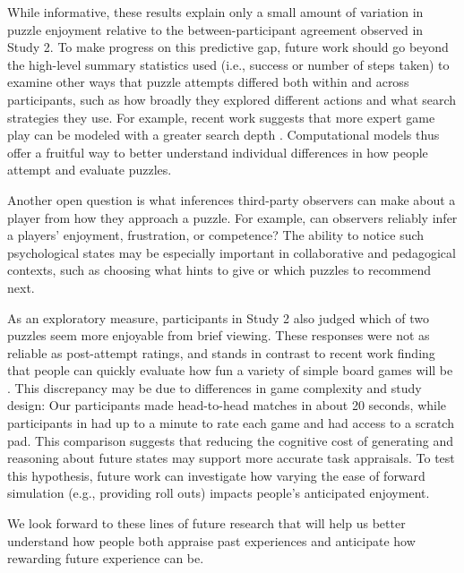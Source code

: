 \documentclass[10pt,letterpaper]{article}
\begin{document}
While informative, these results explain only a small amount of variation in puzzle enjoyment relative to the between-participant agreement observed in Study 2. %
To make progress on this predictive gap, future work should go beyond the high-level summary statistics used (i.e., success or number of steps taken) to examine other ways that puzzle attempts differed both within and across participants, such as how broadly they explored different actions and what search strategies they use. For example, recent work suggests that more expert game play can be modeled with a greater search depth \cite{vanOpheusden2023}. Computational models thus offer a fruitful way to better understand individual differences in how people attempt and evaluate puzzles. 

Another open question is what inferences third-party observers can make about a player from how they approach a puzzle. For example, can observers reliably infer a players' enjoyment, frustration, or competence? The ability to notice such psychological states may be especially important in collaborative and pedagogical contexts, such as choosing what hints to give or which puzzles to recommend next.

As an exploratory measure, participants in Study 2 also judged which of two puzzles seem more enjoyable from brief viewing. These responses were not as reliable as post-attempt ratings, and stands in contrast to recent work finding that people can quickly evaluate how fun a variety of simple board games will be \cite{zhang2024people}. 
This discrepancy may be due to differences in game complexity and study design: Our participants made head-to-head matches in about 20 seconds, while participants in \cite{zhang2024people} had up to a minute to rate each game and had access to a scratch pad. This comparison suggests that reducing the cognitive cost of generating and reasoning about future states may support more accurate task appraisals. To test this hypothesis, future work can investigate how varying the ease of forward simulation (e.g., providing roll outs) impacts people's anticipated enjoyment.

We look forward to these lines of future research that will help us better understand how people both appraise past experiences and anticipate how rewarding future experience can be.

\end{document}
